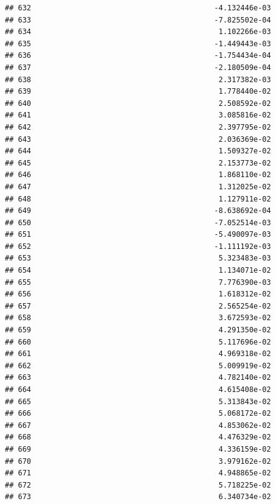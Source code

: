\documentclass[
]{article}
\begin{document}
\begin{verbatim}
## 632                                          -4.132446e-03
## 633                                          -7.825502e-04
## 634                                           1.102266e-03
## 635                                          -1.449443e-03
## 636                                          -1.754434e-04
## 637                                          -2.180509e-04
## 638                                           2.317382e-03
## 639                                           1.778440e-02
## 640                                           2.508592e-02
## 641                                           3.085816e-02
## 642                                           2.397795e-02
## 643                                           2.036369e-02
## 644                                           1.509327e-02
## 645                                           2.153773e-02
## 646                                           1.868110e-02
## 647                                           1.312025e-02
## 648                                           1.127911e-02
## 649                                          -8.638692e-04
## 650                                          -7.052514e-03
## 651                                          -5.490097e-03
## 652                                          -1.111192e-03
## 653                                           5.323483e-03
## 654                                           1.134071e-02
## 655                                           7.776390e-03
## 656                                           1.618312e-02
## 657                                           2.565254e-02
## 658                                           3.672593e-02
## 659                                           4.291350e-02
## 660                                           5.117696e-02
## 661                                           4.969318e-02
## 662                                           5.009919e-02
## 663                                           4.782140e-02
## 664                                           4.615408e-02
## 665                                           5.313843e-02
## 666                                           5.068172e-02
## 667                                           4.853062e-02
## 668                                           4.476329e-02
## 669                                           4.336159e-02
## 670                                           3.979162e-02
## 671                                           4.948865e-02
## 672                                           5.718225e-02
## 673                                           6.340734e-02

\end{verbatim}
\end{document}

